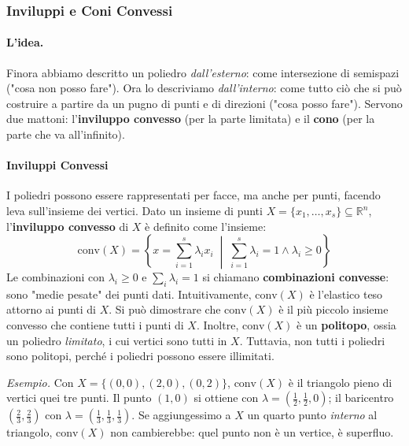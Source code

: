 \documentclass[12pt]{extarticle} %
\begin{document}
\subsubsection{Inviluppi e Coni Convessi}

\paragraph{L'idea.} Finora abbiamo descritto un poliedro \emph{dall'esterno}: come intersezione di semispazi ("cosa non posso fare"). Ora lo descriviamo \emph{dall'interno}: come tutto ciò che si può costruire a partire da un pugno di punti e di direzioni ("cosa posso fare"). Servono due mattoni: l'\textbf{inviluppo convesso} (per la parte limitata) e il \textbf{cono} (per la parte che va all'infinito).

\paragraph{Inviluppi Convessi}
I poliedri possono essere rappresentati per facce, ma anche per punti, facendo leva sull'insieme dei vertici.
Dato un insieme di punti $X = \{x_1, \dots, x_s\} \subseteq \mathbb{R}^n$, l'\textbf{inviluppo convesso} di $X$ è definito come l'insieme:
\[ \text{conv}(X) = \left\{ x = \sum_{i=1}^s \lambda_i x_i \;\middle|\; \sum_{i=1}^s \lambda_i = 1 \wedge \lambda_i \ge 0 \right\} \]
Le combinazioni con $\lambda_i \ge 0$ e $\sum_i \lambda_i = 1$ si chiamano \textbf{combinazioni convesse}: sono "medie pesate" dei punti dati. Intuitivamente, $\text{conv}(X)$ è l'elastico teso attorno ai punti di $X$.
Si può dimostrare che $\text{conv}(X)$ è il più piccolo insieme convesso che contiene tutti i punti di $X$.
Inoltre, $\text{conv}(X)$ è un \textbf{politopo}, ossia un poliedro \emph{limitato}, i cui vertici sono tutti in $X$.
Tuttavia, non tutti i poliedri sono politopi, perché i poliedri possono essere illimitati.

\noindent\textit{Esempio.} Con $X=\{(0,0),(2,0),(0,2)\}$, $\text{conv}(X)$ è il triangolo pieno di vertici quei tre punti. Il punto $(1,0)$ si ottiene con $\lambda=(\tfrac12,\tfrac12,0)$; il baricentro $(\tfrac23,\tfrac23)$ con $\lambda=(\tfrac13,\tfrac13,\tfrac13)$. Se aggiungessimo a $X$ un quarto punto \emph{interno} al triangolo, $\text{conv}(X)$ non cambierebbe: quel punto non è un vertice, è superfluo.
\end{document}
